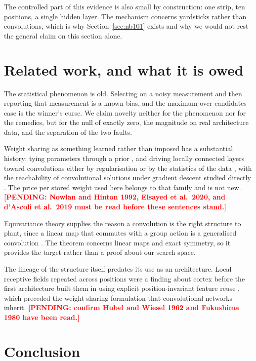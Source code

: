 \documentclass[11pt]{article}
\newcommand{\pending}[1]{\textcolor{red}{\textbf{[PENDING: #1]}}}
\begin{document}
The controlled part of this evidence is also small by construction: one strip, ten positions, a single
hidden layer. The mechanism concerns yardsticks rather than convolutions, which is why
Section~\ref{sec:nb101} exists and why we would not rest the general claim on this section alone.

\section{Related work, and what it is owed}

The statistical phenomenon is old. Selecting on a noisy measurement and then reporting that measurement
is a known bias, and the maximum-over-candidates case is the winner's curse. We claim novelty neither
for the phenomenon nor for the remedies, but for the null of exactly zero, the magnitude on real
architecture data, and the separation of the two faults.

Weight sharing as something learned rather than imposed has a substantial history: tying parameters
through a prior \cite{nowlan}, and driving locally connected layers toward convolutions either by
regularisation or by the statistics of the data \cite{neyshabur,ingrosso}, with the reachability of
convolutional solutions under gradient descent studied directly \cite{dascoli}. The price per stored
weight used here belongs to that family and is not new.
\pending{Nowlan and Hinton 1992, Elsayed et al.\ 2020, and d'Ascoli et al.\ 2019 must be read before
these sentences stand.}

Equivariance theory supplies the reason a convolution is the right structure to plant, since a linear map
that commutes with a group action is a generalised convolution \cite{kondor,cohen}. The theorem concerns
linear maps and exact symmetry, so it provides the target rather than a proof about our search space.

The lineage of the structure itself predates its use as an architecture. Local receptive fields repeated
across positions were a finding about cortex \cite{hubel} before the first architecture built them in
using explicit position-invariant feature reuse \cite{fukushima}, which preceded the weight-sharing
formulation \cite{lecun89} that convolutional networks inherit.
\pending{confirm Hubel and Wiesel 1962 and Fukushima 1980 have been read.}

\section{Conclusion}
\end{document}
